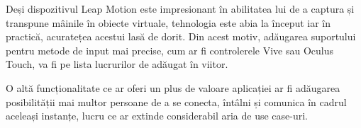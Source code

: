 Deși dispozitivul Leap Motion este impresionant în abilitatea lui de a captura și transpune mâinile în obiecte virtuale, tehnologia este abia la început iar în practică, acuratețea acestui lasă de dorit. Din acest motiv, adăugarea suportului pentru metode de input mai precise, cum ar fi controlerele Vive sau Oculus Touch, va fi pe lista lucrurilor de adăugat în viitor.

O altă funcționalitate ce ar oferi un plus de valoare aplicației ar fi adăugarea posibilității mai multor persoane de a se conecta, întâlni și comunica în cadrul aceleași instanțe, lucru ce ar extinde considerabil aria de use case-uri.
